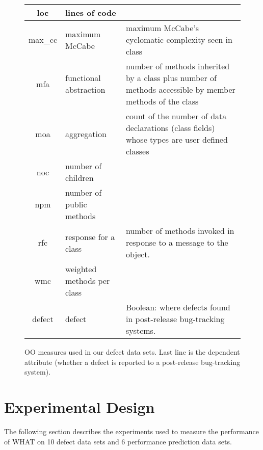 \documentclass[conference]{IEEEtran}
\begin{document}
\begin{figure*}[htbp!]
\begin{center}
{\begin{tabular}{c|l|p{4.7in}}
        \\\hline
        loc & lines of code &\\\hline
        max\_cc & maximum McCabe & maximum McCabe's cyclomatic complexity seen
        in class\\\hline
        mfa & functional abstraction & number of methods inherited by a class
        plus number of methods accessible by member methods of the
        class\\\hline
        moa &  aggregation &  count of the number of data declarations (class
        fields) whose types are user defined classes\\\hline
        noc &  number of children &\\\hline
        npm & number of public methods & \\\hline
        rfc & response for a class &number of  methods invoked in response to
        a message to the object.\\\hline
        wmc & weighted methods per class &\\\hline
        \rowcolor{lightgray}
        defect & defect & Boolean: where defects found in post-release bug-tracking systems.
      \end{tabular}
    }
  \end{center}
  \caption{OO measures used in our defect data sets.  Last line is
    the dependent attribute (whether a defect is reported to  a
    post-release bug-tracking system).}\label{fig:ck}
\end{figure*}

\section{Experimental Design}
The following section describes the experiments used to measure the performance of WHAT on 10 defect data sets and 6 performance prediction data sets.
\end{document}

